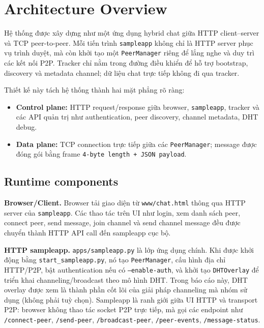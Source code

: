 \section{Architecture Overview}

Hệ thống được xây dựng như một ứng dụng hybrid chat giữa HTTP client--server và TCP peer-to-peer. Mỗi tiến trình \texttt{sampleapp} không chỉ là HTTP server phục vụ trình duyệt, mà còn khởi tạo một \texttt{PeerManager} riêng để lắng nghe và duy trì các kết nối P2P. Tracker chỉ nằm trong đường điều khiển để hỗ trợ bootstrap, discovery và metadata channel; dữ liệu chat trực tiếp không đi qua tracker.

Thiết kế này tách hệ thống thành hai mặt phẳng rõ ràng:
\begin{itemize}[leftmargin=2em]
    \item \textbf{Control plane:} HTTP request/response giữa browser, \texttt{sampleapp}, tracker và các API quản trị như authentication, peer discovery, channel metadata, DHT debug.
    \item \textbf{Data plane:} TCP connection trực tiếp giữa các \texttt{PeerManager}; message được đóng gói bằng frame \texttt{4-byte length + JSON payload}.
\end{itemize}

\subsection{Runtime components}

\textbf{Browser/Client.} Browser tải giao diện từ \texttt{www/chat.html} thông qua HTTP server của \texttt{sampleapp}. Các thao tác trên UI như login, xem danh sách peer, connect peer, send message, join channel và send channel message đều được chuyển thành HTTP API call đến sampleapp cục bộ.

\textbf{HTTP sampleapp.} \texttt{apps/sampleapp.py} là lớp ứng dụng chính. Khi được khởi động bằng \texttt{start\_sampleapp.py}, nó tạo \texttt{PeerManager}, cấu hình địa chỉ HTTP/P2P, bật authentication nếu có \texttt{--enable-auth}, và khởi tạo \texttt{DHTOverlay} để triển khai channeling/broadcast theo mô hình DHT. Trong báo cáo này, DHT overlay được xem là thành phần cốt lõi của giải pháp channeling mà nhóm sử dụng (không phải tuỳ chọn). Sampleapp là ranh giới giữa UI HTTP và transport P2P: browser không thao tác socket P2P trực tiếp, mà gọi các endpoint như \texttt{/connect-peer}, \texttt{/send-peer}, \texttt{/broadcast-peer}, \texttt{/peer-events}, \texttt{/message-status}.

